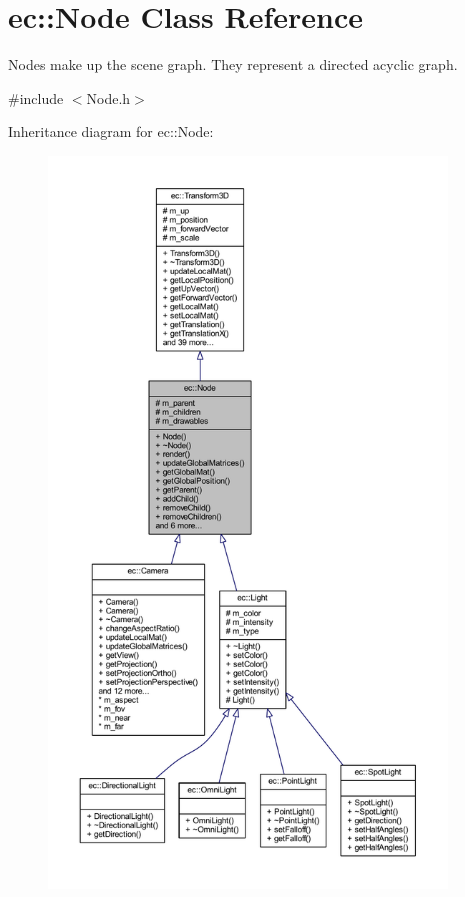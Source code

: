 \hypertarget{classec_1_1_node}{}\section{ec\+:\+:Node Class Reference}
\label{classec_1_1_node}


Nodes make up the scene graph. They represent a directed acyclic graph.  




{\ttfamily \#include $<$Node.\+h$>$}



Inheritance diagram for ec\+:\+:Node\+:\nopagebreak
\begin{figure}[H]
\begin{center}
\leavevmode
\includegraphics[height=550pt]{classec_1_1_node__inherit__graph}
\end{center}
\end{figure}


